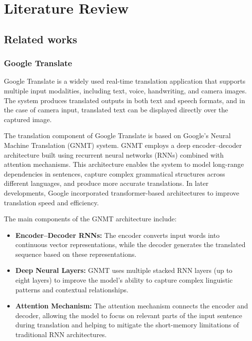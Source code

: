 \chapter{Literature Review}

\section{Related works}

\subsection{Google Translate}

Google Translate is a widely used real-time translation application that supports multiple input modalities, including text, voice, handwriting, and camera images. The system produces translated outputs in both text and speech formats, and in the case of camera input, translated text can be displayed directly over the captured image.

The translation component of Google Translate is based on Google's Neural Machine Translation (GNMT) system. GNMT employs a deep encoder–decoder architecture built using recurrent neural networks (RNNs) combined with attention mechanisms. This architecture enables the system to model long-range dependencies in sentences, capture complex grammatical structures across different languages, and produce more accurate translations. In later developments, Google incorporated transformer-based architectures to improve translation speed and efficiency.

The main components of the GNMT architecture include:

\begin{itemize}
    \item \textbf{Encoder–Decoder RNNs:} The encoder converts input words into continuous vector representations, while the decoder generates the translated sequence based on these representations.

    \item \textbf{Deep Neural Layers:} GNMT uses multiple stacked RNN layers (up to eight layers) to improve the model's ability to capture complex linguistic patterns and contextual relationships.

    \item \textbf{Attention Mechanism:} The attention mechanism connects the encoder and decoder, allowing the model to focus on relevant parts of the input sentence during translation and helping to mitigate the short-memory limitations of traditional RNN architectures.
\end{itemize}

